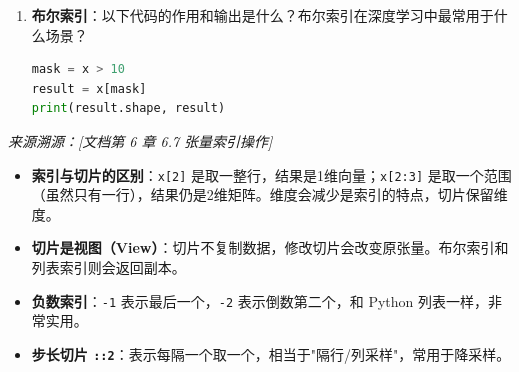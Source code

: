 \documentclass[a4paper,11pt]{ctexart}
\begin{document}
\begin{problembox}
\begin{enumerate}[(1)]
        \item \textbf{布尔索引}：以下代码的作用和输出是什么？布尔索引在深度学习中最常用于什么场景？
        \begin{lstlisting}[language=Python]
mask = x > 10
result = x[mask]
print(result.shape, result)
        \end{lstlisting}
    \end{enumerate}

    \vspace{0.2cm}
    {\color{gray}\small\textit{来源溯源：[文档第 6 章 6.7 张量索引操作]}}
\end{problembox}

\begin{beginnerbox}
    \begin{itemize}
        \item \textbf{索引与切片的区别}：\texttt{x[2]} 是取一整行，结果是1维向量；\texttt{x[2:3]} 是取一个范围（虽然只有一行），结果仍是2维矩阵。维度会减少是索引的特点，切片保留维度。
        \item \textbf{切片是视图（View）}：切片不复制数据，修改切片会改变原张量。布尔索引和列表索引则会返回副本。
        \item \textbf{负数索引}：\texttt{-1} 表示最后一个，\texttt{-2} 表示倒数第二个，和 Python 列表一样，非常实用。
        \item \textbf{步长切片 \texttt{::2}}：表示每隔一个取一个，相当于"隔行/列采样"，常用于降采样。
    \end{itemize}
\end{beginnerbox}
\end{document}
